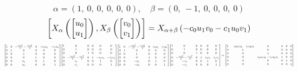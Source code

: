 \documentclass[11pt]{article}
\theoremstyle{definition}
\begin{document}
\[
\alpha = \left( 1, \  0, \  0, \  0, \  0, \  0\right), \quad \beta = \left( 0, \  -1, \  0, \  0, \  0, \  0\right)
\]
\[
\scaletoalign{\textwidth}{\left[ X_{\alpha}\left(\left[\begin{matrix}u_{0}\\u_{1}\end{matrix}\right]\right), X_{\beta}\left(\left[\begin{matrix}v_{0}\\v_{1}\end{matrix}\right]\right) \right] = X_{\alpha + \beta}\left(- c_{0} u_{1} v_{0} - c_{1} u_{0} v_{1}\right)}
\]
\[
\scaletoalign{\textwidth}{{\left[\begin{matrix}1 & 0 & - \frac{c_{0} u_{1}^{2}}{2} - \frac{c_{1} u_{0}^{2}}{2} & 0 & - c_{0} u_{1} & - c_{1} u_{0}\\0 & 1 & 0 & 0 & 0 & 0\\0 & 0 & 1 & 0 & 0 & 0\\0 & 0 & 0 & 1 & 0 & 0\\0 & 0 & u_{1} & 0 & 1 & 0\\0 & 0 & u_{0} & 0 & 0 & 1\end{matrix}\right]} {\left[\begin{matrix}1 & 0 & 0 & 0 & 0 & 0\\0 & 1 & 0 & 0 & 0 & 0\\0 & 0 & 1 & 0 & 0 & 0\\0 & - \frac{c_{0} v_{0}^{2}}{2} - \frac{c_{1} v_{1}^{2}}{2} & 0 & 1 & - c_{0} v_{0} & - c_{1} v_{1}\\0 & v_{0} & 0 & 0 & 1 & 0\\0 & v_{1} & 0 & 0 & 0 & 1\end{matrix}\right]} {\left[\begin{matrix}1 & 0 & - \frac{c_{0} u_{1}^{2}}{2} - \frac{c_{1} u_{0}^{2}}{2} & 0 & c_{0} u_{1} & c_{1} u_{0}\\0 & 1 & 0 & 0 & 0 & 0\\0 & 0 & 1 & 0 & 0 & 0\\0 & 0 & 0 & 1 & 0 & 0\\0 & 0 & - u_{1} & 0 & 1 & 0\\0 & 0 & - u_{0} & 0 & 0 & 1\end{matrix}\right]} {\left[\begin{matrix}1 & 0 & 0 & 0 & 0 & 0\\0 & 1 & 0 & 0 & 0 & 0\\0 & 0 & 1 & 0 & 0 & 0\\0 & - \frac{c_{0} v_{0}^{2}}{2} - \frac{c_{1} v_{1}^{2}}{2} & 0 & 1 & c_{0} v_{0} & c_{1} v_{1}\\0 & - v_{0} & 0 & 0 & 1 & 0\\0 & - v_{1} & 0 & 0 & 0 & 1\end{matrix}\right]} = {\left[\begin{matrix}1 & - c_{0} u_{1} v_{0} - c_{1} u_{0} v_{1} & 0 & 0 & 0 & 0\\0 & 1 & 0 & 0 & 0 & 0\\0 & 0 & 1 & 0 & 0 & 0\\0 & 0 & c_{0} u_{1} v_{0} + c_{1} u_{0} v_{1} & 1 & 0 & 0\\0 & 0 & 0 & 0 & 1 & 0\\0 & 0 & 0 & 0 & 0 & 1\end{matrix}\right]}}
\]
\end{document}
